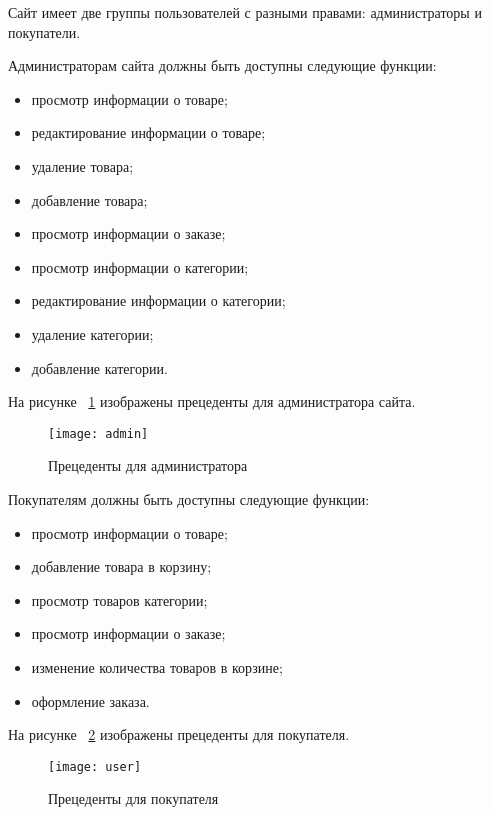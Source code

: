 Сайт имеет две группы пользователей с разными правами: администраторы и покупатели.

Администраторам сайта должны быть доступны следующие функции:
\begin{itemize}
	\item просмотр информации о товаре;
	\item редактирование информации о товаре;
	\item удаление товара;
	\item добавление товара;
	\item просмотр информации о заказе;
	\item просмотр информации о категории;
	\item редактирование информации о категории;
	\item удаление категории;
	\item добавление категории.
\end{itemize}

На рисунке ~\ref{admin:image} изображены прецеденты для администратора сайта.

\begin{figure}[h!]
	\texttt{[image: admin]}
	\caption{Прецеденты для администратора}
	\label{admin:image}
\end{figure}

Покупателям должны быть доступны следующие функции:
\begin{itemize}
	\item просмотр информации о товаре;
	\item добавление товара в корзину;
	\item просмотр товаров категории;
	\item просмотр информации о заказе;
	\item изменение количества товаров в корзине;
	\item оформление заказа.
\end{itemize}

На рисунке ~\ref{user:image} изображены прецеденты для покупателя.
\begin{figure}[h!]
	\texttt{[image: user]}
	\caption{Прецеденты для покупателя}
	\label{user:image}
\end{figure}


